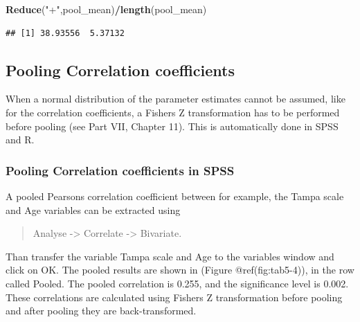 \documentclass[
]{book}
\newenvironment{Shaded}{\begin{snugshade}}{\end{snugshade}}
\newcommand{\KeywordTok}[1]{\textcolor[rgb]{0.13,0.29,0.53}{\textbf{#1}}}
\newcommand{\NormalTok}[1]{#1}
\newcommand{\OperatorTok}[1]{\textcolor[rgb]{0.81,0.36,0.00}{\textbf{#1}}}
\newcommand{\StringTok}[1]{\textcolor[rgb]{0.31,0.60,0.02}{#1}}
\begin{document}
\begin{Shaded}
\begin{Highlighting}[]
\KeywordTok{Reduce}\NormalTok{(}\StringTok{"+"}\NormalTok{,pool_mean)}\OperatorTok{/}\KeywordTok{length}\NormalTok{(pool_mean)}
\end{Highlighting}
\end{Shaded}

\begin{verbatim}
## [1] 38.93556  5.37132
\end{verbatim}

\hypertarget{pooling-correlation-coefficients}{%
\subsection{Pooling Correlation
coefficients}\label{pooling-correlation-coefficients}}

When a normal distribution of the parameter estimates cannot be assumed,
like for the correlation coefficients, a Fishers Z transformation has to
be performed before pooling (see Part VII, Chapter 11). This is
automatically done in SPSS and R.

\hypertarget{pooling-correlation-coefficients-in-spss}{%
\subsubsection{Pooling Correlation coefficients in
SPSS}\label{pooling-correlation-coefficients-in-spss}}

A pooled Pearsons correlation coefficient between for example, the Tampa
scale and Age variables can be extracted using

\begin{quote}
Analyse -\textgreater{} Correlate -\textgreater{} Bivariate.
\end{quote}

Than transfer the variable Tampa scale and Age to the variables window
and click on OK. The pooled results are shown in (Figure
@ref(fig:tab5-4)), in the row called Pooled. The pooled correlation is
0.255, and the significance level is 0.002. These correlations are
calculated using Fishers Z transformation before pooling and after
pooling they are back-transformed.
\end{document}
